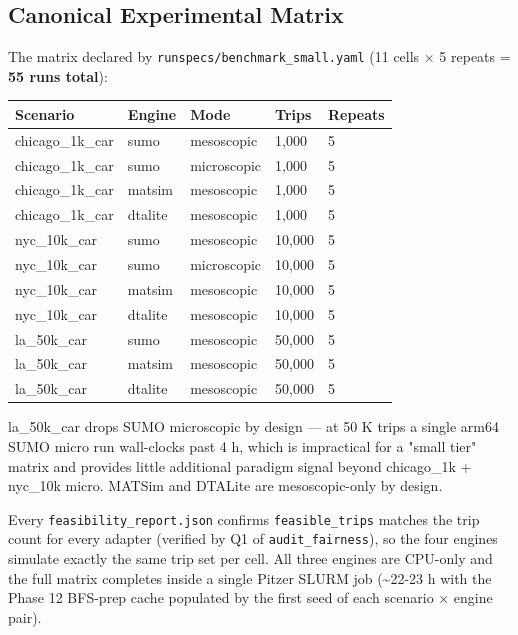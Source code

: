\subsection{Canonical Experimental
Matrix}\label{414-canonical-experimental-matrix}

The matrix declared by \texttt{runspecs/benchmark\_small.yaml} (11 cells
× 5 repeats = \textbf{55 runs total}):

\begin{longtable}[]{@{}lllll@{}}
\toprule\noalign{}
Scenario & Engine & Mode & Trips & Repeats \\
\midrule\noalign{}
\endhead
\bottomrule\noalign{}
\endlastfoot
chicago\_1k\_car & sumo & mesoscopic & 1,000 & 5 \\
chicago\_1k\_car & sumo & microscopic & 1,000 & 5 \\
chicago\_1k\_car & matsim & mesoscopic & 1,000 & 5 \\
chicago\_1k\_car & dtalite & mesoscopic & 1,000 & 5 \\
nyc\_10k\_car & sumo & mesoscopic & 10,000 & 5 \\
nyc\_10k\_car & sumo & microscopic & 10,000 & 5 \\
nyc\_10k\_car & matsim & mesoscopic & 10,000 & 5 \\
nyc\_10k\_car & dtalite & mesoscopic & 10,000 & 5 \\
la\_50k\_car & sumo & mesoscopic & 50,000 & 5 \\
la\_50k\_car & matsim & mesoscopic & 50,000 & 5 \\
la\_50k\_car & dtalite & mesoscopic & 50,000 & 5 \\
\end{longtable}

la\_50k\_car drops SUMO microscopic by design --- at 50 K trips a single
arm64 SUMO micro run wall-clocks past 4 h, which is impractical for a
"small tier" matrix and provides little additional paradigm signal
beyond chicago\_1k + nyc\_10k micro. MATSim and DTALite are
mesoscopic-only by design.

Every \texttt{feasibility\_report.json} confirms
\texttt{feasible\_trips} matches the trip count for every adapter
(verified by Q1 of \texttt{audit\_fairness}), so the four engines
simulate exactly the same trip set per cell. All three engines are
CPU-only and the full matrix completes inside a single Pitzer SLURM job
(\textasciitilde22-23 h with the Phase 12 BFS-prep cache populated by
the first seed of each scenario × engine pair).

